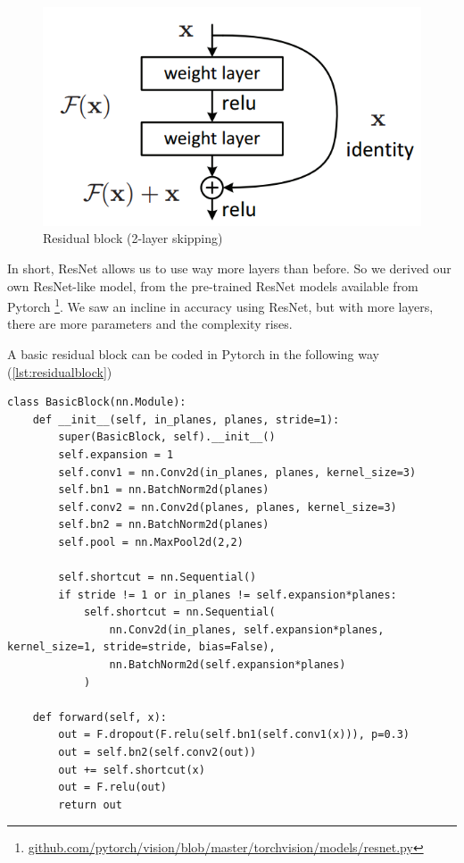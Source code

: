 \begin{figure}[H]
  \includegraphics[scale=0.5]{fig/residualblock.png}
  \centering
  \caption{Residual block (2-layer skipping)}
  \label{fig:residualblock}
\end{figure}

In short, ResNet allows us to use way more layers than before. So we derived our own ResNet-like model, from the pre-trained ResNet models available from Pytorch \footnote{\url{github.com/pytorch/vision/blob/master/torchvision/models/resnet.py}}. We saw an incline in accuracy using ResNet, but with more layers, there are more parameters and the complexity rises.

A basic residual block can be coded in Pytorch in the following way (\ref{lst:residualblock})

\begin{lstlisting}[caption={Pytorch Code for Residual Block}, label={lst:residualblock}, frame=single, breaklines=true]
class BasicBlock(nn.Module):
    def __init__(self, in_planes, planes, stride=1):
        super(BasicBlock, self).__init__()
        self.expansion = 1
        self.conv1 = nn.Conv2d(in_planes, planes, kernel_size=3)
        self.bn1 = nn.BatchNorm2d(planes)
        self.conv2 = nn.Conv2d(planes, planes, kernel_size=3)
        self.bn2 = nn.BatchNorm2d(planes)
        self.pool = nn.MaxPool2d(2,2)

        self.shortcut = nn.Sequential()
        if stride != 1 or in_planes != self.expansion*planes:
            self.shortcut = nn.Sequential(
                nn.Conv2d(in_planes, self.expansion*planes, kernel_size=1, stride=stride, bias=False),
                nn.BatchNorm2d(self.expansion*planes)
            )

    def forward(self, x):
        out = F.dropout(F.relu(self.bn1(self.conv1(x))), p=0.3)
        out = self.bn2(self.conv2(out))
        out += self.shortcut(x)
        out = F.relu(out)
        return out
\end{lstlisting}


